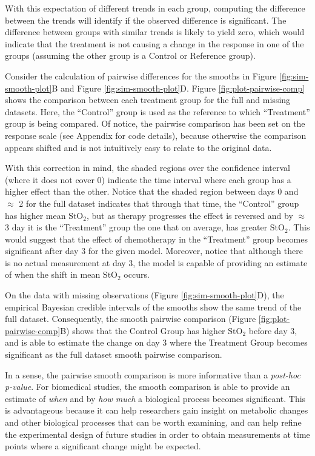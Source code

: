 \documentclass[
]{article}
\begin{document}
With this expectation of different trends in each group, computing the difference between the trends will identify if the observed difference is significant. The difference between groups with similar trends is likely to yield zero, which would indicate that the treatment is not causing a change in the response in one of the groups (assuming the other group is a Control or Reference group).

Consider the calculation of pairwise differences for the smooths in Figure \ref{fig:sim-smooth-plot}B and Figure \ref{fig:sim-smooth-plot}D. Figure \ref{fig:plot-pairwise-comp} shows the comparison between each treatment group for the full and missing datasets. Here, the ``Control'' group is used as the reference to which ``Treatment'' group is being compared. Of notice, the pairwise comparison has been set on the response scale (see Appendix for code details), because otherwise the comparison appears shifted and is not intuitively easy to relate to the original data.

With this correction in mind, the shaded regions over the confidence interval (where it does not cover 0) indicate the time interval where each group has a higher effect than the other. Notice that the shaded region between days 0 and \(\approx\) 2 for the full dataset indicates that through that time, the ``Control'' group has higher mean \(\mbox{StO}_2\), but as therapy progresses the effect is reversed and by \(\approx\) 3 day it is the ``Treatment'' group the one that on average, has greater \(\mbox{StO}_2\). This would suggest that the effect of chemotherapy in the ``Treatment'' group becomes significant after day 3 for the given model. Moreover, notice that although there is no actual measurement at day 3, the model is capable of providing an estimate of when the shift in mean \(\mbox{StO}_2\) occurs.

On the data with missing observations (Figure \ref{fig:sim-smooth-plot}D), the empirical Bayesian credible intervals of the smooths show the same trend of the full dataset. Consequently, the smooth pairwise comparison (Figure \ref{fig:plot-pairwise-comp}B) shows that the Control Group has higher \(\mbox{StO}_2\) before day 3, and is able to estimate the change on day 3 where the Treatment Group becomes significant as the full dataset smooth pairwise comparison.

In a sense, the pairwise smooth comparison is more informative than a \emph{post-hoc} \emph{p-value}. For biomedical studies, the smooth comparison is able to provide an estimate of \emph{when} and by \emph{how much} a biological process becomes significant. This is advantageous because it can help researchers gain insight on metabolic changes and other biological processes that can be worth examining, and can help refine the experimental design of future studies in order to obtain measurements at time points where a significant change might be expected.
\end{document}
